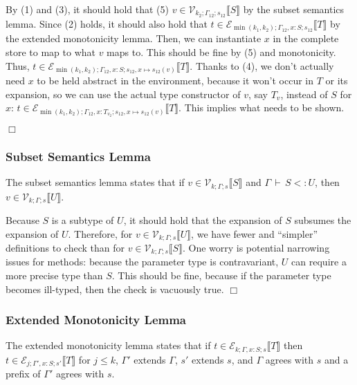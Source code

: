 \documentclass[9pt]{sigplanconf}
\newenvironment{proofsketch}{{\em Proof Sketch:}}{$\Box$}
\newcommand{\ts}{\,\vdash\,}
\newcommand{\envplus}[1]{, #1}
\newcommand{\relv}[4]{\mathcal{V}_{#1;#2;#3}\llbracket#4\rrbracket}
\newcommand{\rele}[4]{\mathcal{E}_{#1;#2;#3}\llbracket#4\rrbracket}
\begin{document}
\begin{proofsketch}
By (1) and (3), it should hold that (5) $v \in \relv {k_2}
{\Gamma_{12}} {s_{12}} {S}$ by the subset semantics lemma.  Since (2)
holds, it should also hold that ${t} \in \rele {\min(k_1,k_2)}
{\Gamma_{12} \envplus{{x} : S}} {s_{12}} T$ by the extended
monotonicity lemma. Then, we can instantiate $x$ in the complete store
to map to what $v$ maps to. This should be fine by (5) and
monotonicity. Thus, ${t} \in \rele {\min(k_1,k_2)} {\Gamma_{12}
  \envplus{{x} : S}} {s_{12} \envplus{{x} \mapsto s_{12}(v)}}
T$. Thanks to (4), we don't actually need $x$ to be held abstract in
the environment, because it won't occur in $T$ or its expansion, so we
can use the actual type constructor of $v$, say $T_{v}$, instead of
$S$ for $x$: ${t} \in \rele {\min(k_1,k_2)} {\Gamma_{12} \envplus{{x}
    : {T_{v_2}}}} {s_{12} \envplus{{x} \mapsto s_{12}(v)}} T$. This
implies what needs to be shown.

\end{proofsketch}

\subsubsection{Subset Semantics Lemma}

The subset semantics lemma states that if $v \in \relv k \Gamma s S$
and $\Gamma \ts S <: U$, then $v \in \relv k \Gamma s U$.

\begin{proofsketch}
Because $S$ is a subtype of $U$, it should hold that the expansion of
$S$ subsumes the expansion of $U$. Therefore, for $v \in \relv k
\Gamma s U$, we have fewer and ``simpler'' definitions to check than
for $v \in \relv k \Gamma s S$. One worry is potential narrowing
issues for methods: because the parameter type is contravariant, $U$
can require a more precise type than $S$. This should be fine, because
if the parameter type becomes ill-typed, then the check is vacuously
true.
\end{proofsketch}

\subsubsection{Extended Monotonicity Lemma}

The extended monotonicity lemma states that if $t \in \rele k {\Gamma
  \envplus{x : S}} s T$ then $t \in \rele j {\Gamma' \envplus{x : S}}
{s'} T$ for $j \leq k$, $\Gamma'$ extends $\Gamma$, $s'$
extends $s$, and $\Gamma$ agrees with $s$ and a prefix of $\Gamma'$
agrees with $s$.
\end{document}
